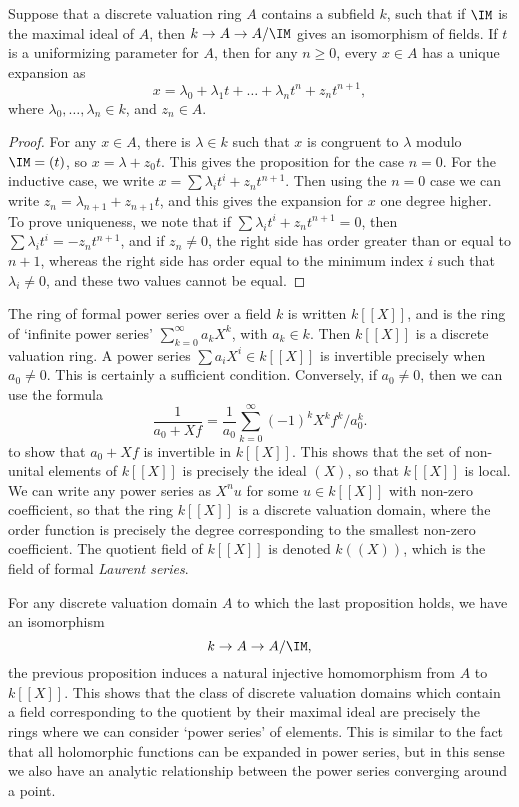 \begin{prop}
    Suppose that a discrete valuation ring $A$ contains a subfield $k$, such that if $\IM$ is the maximal ideal of $A$, then $k \to A \to A/\IM$ gives an isomorphism of fields. If $t$ is a uniformizing parameter for $A$, then for any $n \geq 0$, every $x \in A$ has a unique expansion as
    \[ x = \lambda_0 + \lambda_1 t + \dots + \lambda_n t^n + z_nt^{n+1}, \]
    where $\lambda_0,\dots,\lambda_n \in k$, and $z_n \in A$.
\end{prop}
\begin{proof}
    For any $x \in A$, there is $\lambda \in k$ such that $x$ is congruent to $\lambda$ modulo $\IM = (t)$, so $x = \lambda + z_0t$. This gives the proposition for the case $n = 0$. For the inductive case, we write $x = \sum \lambda_i t^i + z_n t^{n+1}$. Then using the $n = 0$ case we can write $z_n = \lambda_{n+1} + z_{n+1}t$, and this gives the expansion for $x$ one degree higher. To prove uniqueness, we note that if $\sum \lambda_i t^i + z_n t^{n+1} = 0$, then $\sum \lambda_i t^i = -z_n t^{n+1}$, and if $z_n \neq 0$, the right side has order greater than or equal to $n+1$, whereas the right side has order equal to the minimum index $i$ such that $\lambda_i \neq 0$, and these two values cannot be equal.
\end{proof}

\begin{example}
    The ring of formal power series over a field $k$ is written $k[[X]]$, and is the ring of `infinite power series' $\sum_{k = 0}^\infty a_k X^k$, with $a_k \in k$. Then $k[[X]]$ is a discrete valuation ring. A power series $\sum a_i X^i \in k[[X]]$ is invertible precisely when $a_0 \neq 0$. This is certainly a sufficient condition. Conversely, if $a_0 \neq 0$, then we can use the formula
    \[ \frac{1}{a_0 + Xf} = \frac{1}{a_0} \sum_{k = 0}^\infty (-1)^k X^k f^k / a_0^k. \]
    to show that $a_0 + Xf$ is invertible in $k[[X]]$. This shows that the set of non-unital elements of $k[[X]]$ is precisely the ideal $(X)$, so that $k[[X]]$ is local. We can write any power series as $X^n u$ for some $u \in k[[X]]$ with non-zero coefficient, so that the ring $k[[X]]$ is a discrete valuation domain, where the order function is precisely the degree corresponding to the smallest non-zero coefficient. The quotient field of $k[[X]]$ is denoted $k((X))$, which is the field of formal \emph{Laurent series}.
\end{example}

For any discrete valuation domain $A$ to which the last proposition holds, we have an isomorphism
%
\[ k \to A \to A/\IM, \]
%
the previous proposition induces a natural injective homomorphism from $A$ to $k[[X]]$. This shows that the class of discrete valuation domains which contain a field corresponding to the quotient by their maximal ideal are precisely the rings where we can consider `power series' of elements. This is similar to the fact that all holomorphic functions can be expanded in power series, but in this sense we also have an analytic relationship between the power series converging around a point.


